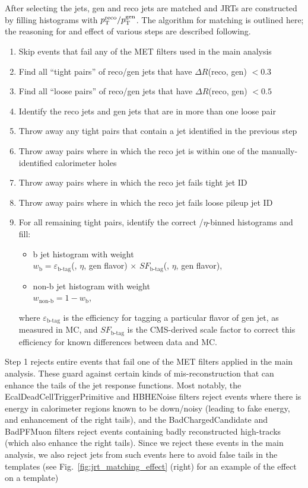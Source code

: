 After selecting the jets, gen and reco jets are matched and JRTs are constructed by 
filling histograms with $p_{\mathrm{T}}^\text{reco}/p_{\mathrm{T}}^\text{gen}$.
The algorithm for matching is outlined here; the reasoning for and effect of various steps are described following.
\begin{enumerate}
\item Skip events that fail any of the MET filters used in the main analysis
\item Find all ``tight pairs'' of reco/gen jets that have $\Delta R$(reco, gen) $<0.3$
\item Find all ``loose pairs'' of reco/gen jets that have $\Delta R$(reco, gen) $<0.5$
\item Identify the reco jets and gen jets that are in more than one loose pair
\item Throw away any tight pairs that contain a jet identified in the previous step
\item Throw away pairs where in which the reco jet is within one of the manually-identified calorimeter holes
\item Throw away pairs where in which the reco jet fails tight jet ID
\item Throw away pairs where in which the reco jet fails loose pileup jet ID
\item For all remaining tight pairs, identify the correct \pt/$\eta$-binned histograms and fill:
  \begin{itemize}
    \item b jet histogram with weight \\
    \hphantom{1 cm}$w_\text{b}=\varepsilon_\text{b-tag}$(\pt, $\eta$, gen flavor) $\times$ $SF_\text{b-tag}$(\pt, $\eta$, gen flavor),
    \item non-b jet histogram with weight \\
    \hphantom{1 cm}$w_\text{non-b} = 1-w_\text{b}$,
  \end{itemize}
  where $\varepsilon_\text{b-tag}$ is the efficiency for tagging a particular flavor of gen jet, as measured in MC, and $SF_\text{b-tag}$ is 
  the CMS-derived scale factor to correct this efficiency for known differences between data and MC.
\end{enumerate}

Step 1 rejects entire events that fail one of the MET filters applied in the main analysis.
These guard against certain kinds of mis-reconstruction that can enhance the tails of the
jet response functions. Most notably, the EcalDeadCellTriggerPrimitive and HBHENoise filters
reject events where there is energy in calorimeter regions known to be down/noisy (leading to 
fake energy, and enhancement of the right tails), and the BadChargedCandidate and BadPFMuon
filters reject events containing badly reconstructed high-\pt tracks (which also enhance
the right tails). Since we reject these events in the main analysis, we also reject
jets from such events here to avoid false tails in the templates 
(see Fig.~\ref{fig:jrt_matching_effect} (right) for an example of the effect on a template)


